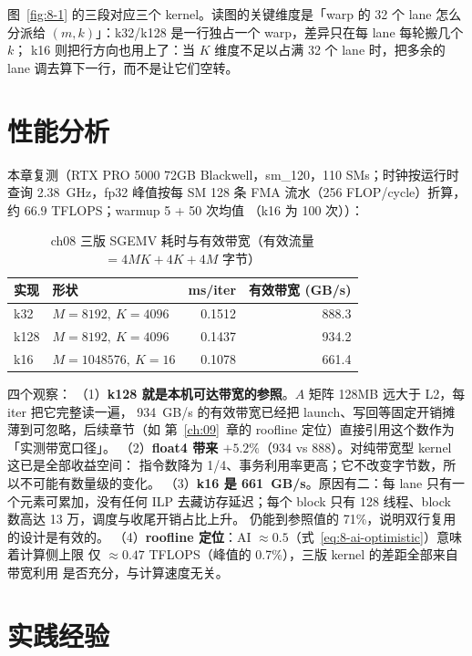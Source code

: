 图~\ref{fig:8-1} 的三段对应三个 kernel。读图的关键维度是「warp 的 32 个 lane
怎么分派给 $(m, k)$」：k32/k128 是一行独占一个 warp，差异只在每 lane 每轮搬几个 $k$；
k16 则把行方向也用上了：当 $K$ 维度不足以占满 32 个 lane 时，把多余的 lane
调去算下一行，而不是让它们空转。

\section{性能分析}

本章复测（RTX PRO 5000 72GB Blackwell，sm\_120，110 SMs；时钟按运行时查询
2.38~GHz，fp32 峰值按每 SM 128 条 FMA 流水（256 FLOP/cycle）折算，
约 $66.9$ TFLOPS；warmup 5 + 50 次均值
（k16 为 100 次））：

\begin{table}[htbp]
\centering
\caption{ch08 三版 SGEMV 耗时与有效带宽（有效流量 $= 4MK + 4K + 4M$ 字节）}
\label{tab:8-bench}
\begin{tabular}{llrr}
\toprule
实现 & 形状 & ms/iter & 有效带宽 (GB/s) \\
\midrule
k32  & $M{=}8192,\ K{=}4096$   & 0.1512 & 888.3 \\
k128 & $M{=}8192,\ K{=}4096$   & 0.1437 & 934.2 \\
k16  & $M{=}1048576,\ K{=}16$  & 0.1078 & 661.4 \\
\bottomrule
\end{tabular}
\end{table}

四个观察：
（1）\textbf{k128 就是本机可达带宽的参照}。$A$ 矩阵 128MB 远大于 L2，每 iter 把它完整读一遍，
934~GB/s 的有效带宽已经把 launch、写回等固定开销摊薄到可忽略，后续章节（如
第~\ref{ch:09}~章的 roofline 定位）直接引用这个数作为「实测带宽口径」。
（2）\textbf{float4 带来 $+5.2\%$}（934 vs 888）。对纯带宽型 kernel 这已是全部收益空间：
指令数降为 1/4、事务利用率更高；它不改变字节数，所以不可能有数量级的变化。
（3）\textbf{k16 是 661~GB/s}。原因有二：每 lane 只有一个元素可累加，没有任何 ILP
去藏访存延迟；每个 block 只有 128 线程、block 数高达 13 万，调度与收尾开销占比上升。
仍能到参照值的 71\%，说明双行复用的设计是有效的。
（4）\textbf{roofline 定位}：AI $\approx 0.5$（式~\ref{eq:8-ai-optimistic}）意味着计算侧上限
仅 $\approx 0.47$ TFLOPS（峰值的 0.7\%），三版 kernel 的差距全部来自带宽利用
是否充分，与计算速度无关。

\section{实践经验}

